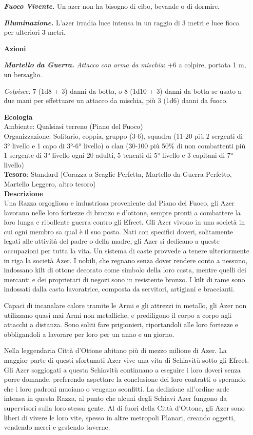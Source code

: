 \begin{multicols}{2}
\textit{\textbf{Fuoco Vivente.}} Un azer non ha bisogno di cibo, bevande o di dormire.

\textit{\textbf{Illuminazione.}} L'azer irradia luce intensa in un raggio di 3 metri e luce fioca per ulteriori 3 metri.

\textbf{Azioni}

\textit{\textbf{Martello da Guerra.} Attacco con arma da mischia}: +6 a colpire, portata 1 m, un bersaglio.

\textit{Colpisce:} 7 (1d8 + 3) danni da botta, o 8 (1d10 + 3) danni da botta se usato a due mani per effettuare un attacco da mischia, più 3 (1d6) danni da fuoco.

\textbf{Ecologia}\\
Ambiente: Qualsiasi terreno (Piano del Fuoco)\\
Organizzazione: Solitario, coppia, gruppo (3-6), squadra (11-20 più 2 sergenti di 3° livello e 1 capo di 3°-6° livello) o clan (30-100 più 50\% di non combattenti più 1 sergente di 3° livello ogni 20 adulti, 5 tenenti di 5° livello e 3 capitani di 7° livello)\\
\textbf{Tesoro}: Standard (Corazza a Scaglie Perfetta, Martello da Guerra Perfetto, Martello Leggero, altro tesoro)\\
\textbf{Descrizione}\\
Una Razza orgogliosa e industriosa proveniente dal Piano del Fuoco, gli Azer lavorano nelle loro fortezze di bronzo e d'ottone, sempre pronti a combattere la loro lunga e ribollente guerra contro gli Efreet. Gli Azer vivono in una società in cui ogni membro sa qual è il suo posto. Nati con specifici doveri, solitamente legati alle attività del padre o della madre, gli Azer si dedicano a queste occupazioni per tutta la vita. Un sistema di caste provvede a tenere ulteriormente in riga la società Azer. I nobili, che regnano senza dover rendere conto a nessuno, indossano kilt di ottone decorato come simbolo della loro casta, mentre quelli dei mercanti e dei proprietari di negozi sono in resistente bronzo. I kilt di rame sono indossati dalla casta lavoratrice, composta da servitori, artigiani e braccianti.

Capaci di incanalare calore tramite le Armi e gli attrezzi in metallo, gli Azer non utilizzano quasi mai Armi non metalliche, e prediligono il corpo a corpo agli attacchi a distanza. Sono soliti fare prigionieri, riportandoli alle loro fortezze e obbligandoli a lavorare per loro per un anno e un giorno.

Nella leggendaria Città d'Ottone abitano più di mezzo milione di Azer. La maggior parte di questi sfortunati Azer vive una vita di Schiavitù sotto gli Efreet. Gli Azer soggiogati a questa Schiavitù continuano a eseguire i loro doveri senza porre domande, preferendo aspettare la conclusione dei loro contratti o sperando che i loro padroni muoiano o vengano sconfitti. La dedizione all'ordine arde intensa in questa Razza, al punto che alcuni degli Schiavi Azer fungono da supervisori sulla loro stessa gente. Al di fuori della Città d'Ottone, gli Azer sono liberi di vivere le loro vite, spesso in altre metropoli Planari, creando oggetti, vendendo merci e gestendo taverne.


\end{multicols}
